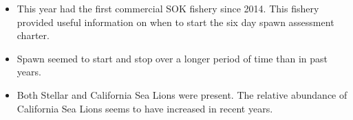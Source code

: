 \begin{itemize}

\item This year had the first commercial SOK fishery since 2014.
This fishery provided useful information on when to start the six day spawn assessment charter.

\item Spawn seemed to start and stop over a longer period of time than in past years.

\item Both Stellar and California Sea Lions were present.
The relative abundance of California Sea Lions seems to have increased in recent years.

\end{itemize}
